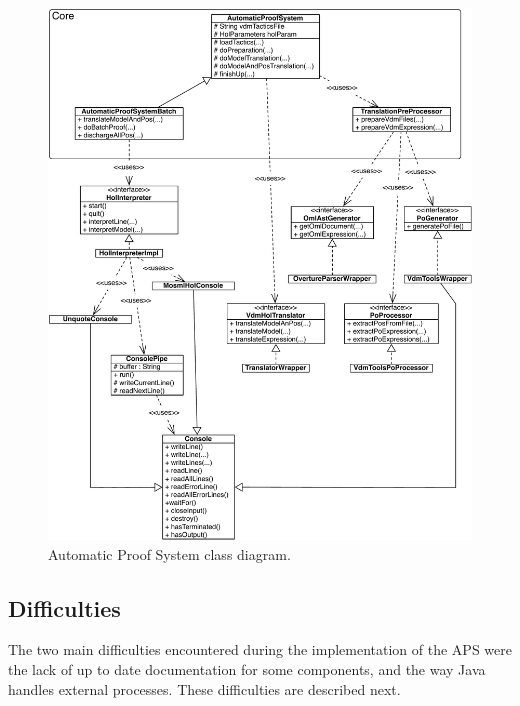 \documentclass[]{article}
\begin{document}
\begin{figure}%
    \includegraphics[width=\textwidth]{images/aps_class_diagram.pdf}
    \caption[APS class diagram]{Automatic Proof System class diagram.}
    \label{fig:aps_class}
\end{figure}


\subsection{Difficulties}
\label{sub:implementation_difficulties}

The two main difficulties encountered during the implementation of the APS were the lack of up to date documentation for some components, and the way Java handles external processes.
These difficulties are described next.
\end{document}
